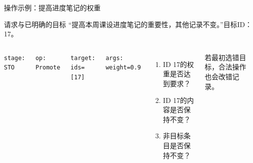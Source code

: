 \begin{frame}{操作示例：提高进度笔记的权重}
    \small
    \begin{block}{请求与已明确的目标}
        “提高本周课设进度笔记的重要性，其他记录不变。”目标ID：17。
    \end{block}
    \begin{columns}[T,onlytextwidth]
        \par\vspace{2mm}
        \texttt{stage: STO}\par
        \texttt{op: Promote}\par
        \texttt{target: ids=[17]}\par
        \texttt{args: weight=0.9}\par

        \par\vspace{2mm}
        \begin{enumerate}\setlength{\itemsep}{2.5mm}
            \item ID 17的权重是否达到要求？
            \item ID 17的内容是否保持不变？
            \item 非目标条目是否保持不变？
        \end{enumerate}
        \vspace{2mm}
        若最初选错目标，合法操作也会改错记录。
    \end{columns}
\end{frame}

